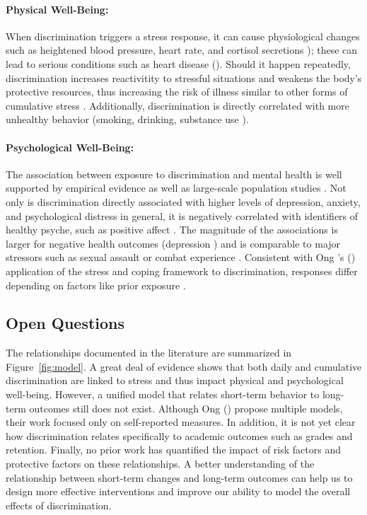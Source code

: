\paragraph{Physical Well-Being:}
\label{sec:back-discrimination-physical}
When discrimination triggers a stress response, it can cause physiological changes such as heightened blood pressure, heart rate, and cortisol secretions \citep{Brondolo:2008, Steffen:2003, Smart:2010}); these can lead to serious conditions such as heart disease (\eg \cite{Marshall:1997, Cohen:1994}). Should it happen repeatedly, discrimination increases reactivitity to stressful situations \citep{GuyllMatthewsBrom-berger:2001} and weakens the body's protective resources, thus increasing the risk of illness similar to other forms of cumulative stress \citep{GeeSpencerChenTakeuchi:2007}. Additionally, discrimination is directly correlated with more unhealthy behavior (\eg smoking, drinking, substance use \citep{LandrineKlonoff:1996, MartinTuchRoman:2003}). 

\paragraph{Psychological Well-Being:}
\label{sec:back-discrimination-mental}
The association between exposure to discrimination and mental health is well supported by empirical evidence \citep{Pascoe:2009} as well as large-scale population studies \citep{Kessler:1999}. Not only is discrimination directly associated with higher levels of depression, anxiety, and psychological distress in general, it is negatively correlated with identifiers of healthy psyche, such as positive affect \citep{Schmitt:2014}. The magnitude of the associations is larger for negative health outcomes (\eg depression \citep{Schmitt:2014}) and is comparable to major stressors such as sexual assault or combat experience \citep{Kessler:1999}. 
Consistent with Ong \etal's (\citeyear{Ong:2009}) application of the stress and coping framework to discrimination, responses differ depending on factors like prior exposure  \citep{Kessler:1999}. 

\subsection{Open Questions}
\noindent The relationships documented in the literature are summarized in Figure~\ref{fig:model}.  A great deal of evidence shows that both daily and cumulative discrimination are linked to stress and thus impact physical and psychological well-being.  However, a unified model that relates short-term behavior to long-term outcomes still does not exist. Although Ong \etal (\citeyear{Ong:2009}) propose multiple models, their work focused only on self-reported measures. In addition, it is not yet clear how discrimination relates specifically to academic outcomes such as grades and retention. Finally, no prior work has quantified the impact of risk factors and protective factors on these relationships. A better understanding of the relationship between short-term changes and long-term outcomes can help us to design more effective interventions and improve our ability to model the overall effects of discrimination.